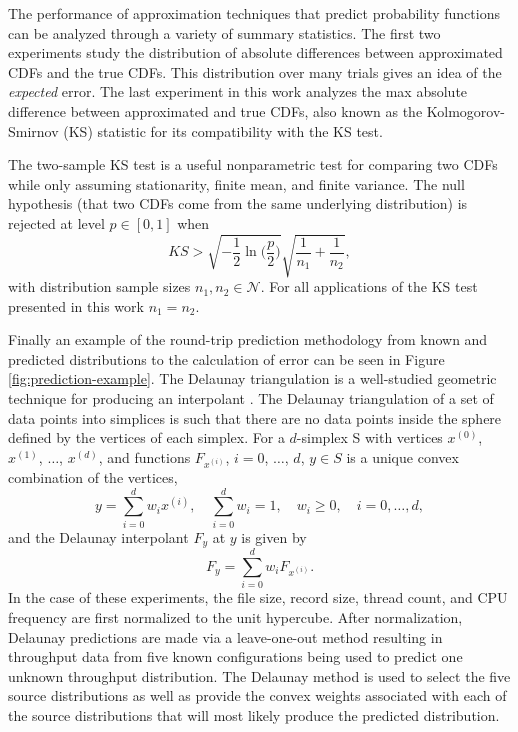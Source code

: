 \documentclass[letterpaper, 10 pt, conference]{ieeeconf}  %
\begin{document}
The performance of approximation techniques that predict probability functions can be analyzed through a variety of summary statistics. The first two experiments study the distribution of absolute differences between approximated CDFs and the true CDFs. This distribution over many trials gives an idea of the \textit{expected} error. The last experiment in this work analyzes the max absolute difference between approximated and true CDFs, also known as the Kolmogorov-Smirnov (KS) statistic \cite{lilliefors1967kolmogorov} for its compatibility with the KS test.

The two-sample KS test is a useful nonparametric test for comparing two CDFs while only assuming stationarity, finite mean, and finite variance. The null hypothesis (that two CDFs come from the same underlying distribution) is rejected at level $p \in [0,1]$ when
 $$ KS > \sqrt{-\frac{1}{2}\ln\biggl(\frac{p}{2}\biggr)} \sqrt{\frac{1}{n_1} + \frac{1}{n_2}}, $$
with distribution sample sizes $n_1,n_2 \in \mathcal{N}$. For all applications of the KS test presented in this work $n_1 = n_2$.

Finally an example of the round-trip prediction methodology from known and predicted distributions to the calculation of error can be seen in Figure \ref{fig:prediction-example}. The Delaunay triangulation is a well-studied geometric technique for producing an interpolant \cite{lee1980two}. The Delaunay triangulation of a set of data points into simplices is such that there are no data points inside the sphere defined by the vertices of each simplex. For a $d$-simplex S with vertices $x^{(0)}$, $x^{(1)}$, $\ldots$, $x^{(d)}$, and functions $F_{x^{(i)}}$, $i=0$, $\ldots$, $d$, $y \in S$ is a unique convex combination of the vertices,
$$ y = \sum_{i=0}^{d} w_i x^{(i)}, \quad \sum_{i=0}^{d} w_i = 1, \quad w_i \geq 0, \quad i=0,\ldots,d, $$
and the Delaunay interpolant $F_y$ at $y$ is given by
$$ F_y = \sum_{i=0}^{d} w_i F_{x^{(i)}}. $$
In the case of these experiments, the file size, record size, thread count, and CPU frequency are first normalized to the unit hypercube. After normalization, Delaunay predictions are made via a leave-one-out method resulting in throughput data from five known configurations being used to predict one unknown throughput distribution. The Delaunay method is used to select the five source distributions as well as provide the convex weights associated with each of the source distributions that will most likely produce the predicted distribution.
\end{document}
